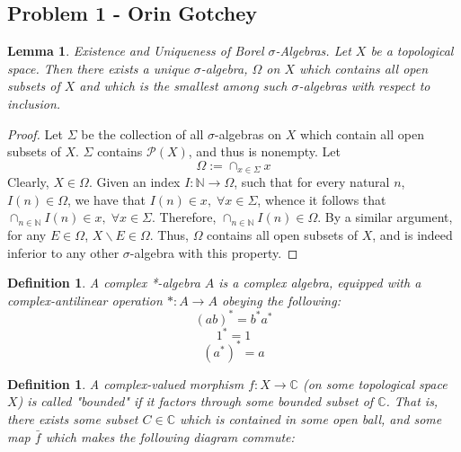 \documentclass{article}
\newcommand{\C}{\mathbb{C}}
\newtheorem{lemma}[subsection]{Lemma}
\newtheorem{definition}[subsection]{Definition}
\begin{document}
\subsection{Problem 1 - Orin Gotchey}
\begin{lemma}{Existence and Uniqueness of Borel $\sigma$-Algebras.}
	Let $X$ be a topological space.  Then there exists a unique $\sigma$-algebra, $\Omega$ on $X$ which contains all open subsets of $X$ and which is the smallest among such $\sigma$-algebras with respect to inclusion. 
\end{lemma}
\begin{proof}
	Let $\Sigma$ be the collection of all $\sigma$-algebras on $X$ which contain all open subsets of $X$.  $\Sigma$ contains $\mathcal{P}(X)$, and thus is nonempty.	Let
	\begin{equation*}
	\Omega := \cap_{x\in\Sigma}x
	\end{equation*}
	Clearly, $X\in\Omega$. Given an index $I: \mathbb{N}\rightarrow\Omega$, such that for every natural $n$, $I(n)\in\Omega$, we have that $I(n)\in{x},\;\forall{x}\in\Sigma$, whence it follows that $\cap_{n\in\mathbb{N}}I(n)\in{x},\;\forall{x}\in\Sigma$.  Therefore, $\cap_{n\in\mathbb{N}}I(n)\in{\Omega}$.  By a similar argument, for any $E\in\Omega$, $X\backslash{E}\in\Omega$.  Thus, $\Omega$ contains all open subsets of $X$, and is indeed inferior to any other $\sigma$-algebra with this property.  
\end{proof}
\begin{definition}
	A \textit{complex *-algebra} $A$ is a complex algebra, equipped with a complex-antilinear operation $*:A\rightarrow{A}$ obeying the following:
	\begin{equation*}
		(ab)^* = b^*a^*
	\end{equation*}
	\begin{equation*}
		1^* = 1
	\end{equation*}
	\begin{equation*}
		(a^*)^* = a
	\end{equation*}
\end{definition}
\begin{definition}
	A complex-valued morphism $f: X\rightarrow{}\C$ (on some topological space $X$) is called "bounded" if it factors through some bounded subset of $\C$.  That is, there exists some subset $C\in\C$ which is contained in some open ball, and some map $\bar{f}$ which makes the following diagram commute:
\end{definition}
\begin{center}
\end{center}
\end{document}

